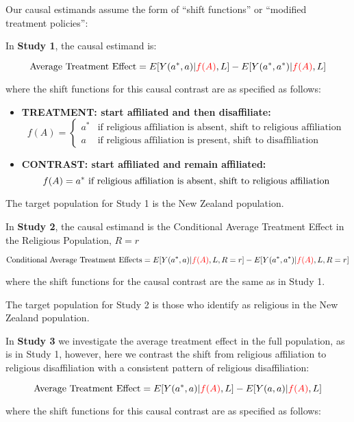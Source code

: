 \documentclass[
  singlecolumn]{article}
\begin{document}
Our causal estimands assume the form of ``shift functions'' or
``modified treatment policies'':

In \textbf{Study 1}, the causal estimand is:

\[ \text{Average Treatment Effect} = E[Y(a^*,a)|\textcolor{red}{f(A)},L] -  E[Y(a^*, a^*)|\textcolor{red}{f(A)},L] \]

where the shift functions for this causal contrast are as specified as
follows:

\begin{itemize}
\item
  \textbf{TREATMENT: start affiliated and then disaffiliate:} \[
   f(A) = \begin{cases} a^* & \text{if religious affiliation is absent, shift to religious affiliation} \\ 
   a & \text{if religious affiliation is present, shift to disaffiliation} \end{cases}
   \]
\item
  \textbf{CONTRAST: start affiliated and remain affiliated:} \[
   f(A) = a^* ~ \text{if religious affiliation is absent, shift to religious affiliation} \\ 
  \]
\end{itemize}

The target population for Study 1 is the New Zealand population.

In \textbf{Study 2}, the causal estimand is the Conditional Average
Treatment Effect in the Religious Population, \(R = r\)

\[ 
\text{Conditional Average Treatment Effects} = E[Y(a^*,a)|\textcolor{red}{f(A)},L, R = r] -  E[Y(a^*, a^*)|\textcolor{red}{f(A)},L, R = r] 
\]

where the shift functions for the causal contrast are the same as in
Study 1.

The target population for Study 2 is those who identify as religious in
the New Zealand population.

In \textbf{Study 3} we investigate the average treatment effect in the
full population, as is in Study 1, however, here we contrast the shift
from religious affiliation to religious disaffiliation with a consistent
pattern of religious disaffiliation:

\[ 
\text{Average Treatment Effect} = E[Y(a^*,a)|\textcolor{red}{f(A)},L] -  E[Y(a, a)|\textcolor{red}{f(A)},L] 
\]

where the shift functions for this causal contrast are as specified as
follows:
\end{document}
